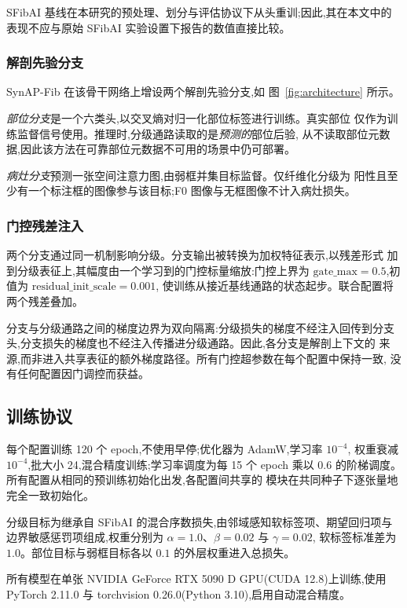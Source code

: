 SFibAI 基线在本研究的预处理、划分与评估协议下从头重训;因此,其在本文中的
表现不应与原始 SFibAI 实验设置下报告的数值直接比较。

\subsubsection{解剖先验分支}

SynAP-Fib 在该骨干网络上增设两个解剖先验分支,如
图~\ref{fig:architecture} 所示。

\emph{部位分支}是一个六类头,以交叉熵对归一化部位标签进行训练。真实部位
仅作为训练监督信号使用。推理时,分级通路读取的是\emph{预测的}部位后验,
从不读取部位元数据,因此该方法在可靠部位元数据不可用的场景中仍可部署。

\emph{病灶分支}预测一张空间注意力图,由弱框并集目标监督。仅纤维化分级为
阳性且至少有一个标注框的图像参与该目标;F0 图像与无框图像不计入病灶损失。

\subsubsection{门控残差注入}

两个分支通过同一机制影响分级。分支输出被转换为加权特征表示,以残差形式
加到分级表征上,其幅度由一个学习到的门控标量缩放:门控上界为
$\mathrm{gate\_max}=0.5$,初值为 $\mathrm{residual\_init\_scale}=0.001$,
使训练从接近基线通路的状态起步。联合配置将两个残差叠加。

分支与分级通路之间的梯度边界为双向隔离:分级损失的梯度不经注入回传到分支
头,分支损失的梯度也不经注入传播进分级通路。因此,各分支是解剖上下文的
来源,而非进入共享表征的额外梯度路径。所有门控超参数在每个配置中保持一致,
没有任何配置因门调控而获益。

\subsection{训练协议}

每个配置训练 120 个 epoch,不使用早停;优化器为 AdamW,学习率 $10^{-4}$,
权重衰减 $10^{-4}$,批大小 24,混合精度训练;学习率调度为每 15 个 epoch
乘以 $0.6$ 的阶梯调度。所有配置从相同的预训练初始化出发,各配置间共享的
模块在共同种子下逐张量地完全一致初始化。

分级目标为继承自 SFibAI 的混合序数损失,由邻域感知软标签项、期望回归项与
边界敏感惩罚项组成,权重分别为 $\alpha=1.0$、$\beta=0.02$ 与 $\gamma=0.02$,
软标签标准差为 $1.0$。部位目标与弱框目标各以 $0.1$ 的外层权重进入总损失。

所有模型在单张 NVIDIA GeForce RTX 5090 D GPU(CUDA 12.8)上训练,使用
PyTorch 2.11.0 与 torchvision 0.26.0(Python 3.10),启用自动混合精度。

